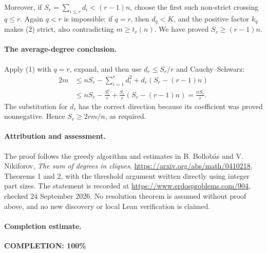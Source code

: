 Moreover, if \(S_r=\sum_{i\leq r}d_i<(r-1)n\), choose
the first such non-strict crossing \(q\leq r\).
Again \(q<r\) is impossible; if \(q=r\), then
\(d_q<K\), and the positive factor \(k_q\) makes (2)
strict, also contradicting \(m\geq t_r(n)\).
We have proved \(S_r\geq(r-1)n\).

\paragraph{The average-degree conclusion.}
Apply (1) with \(q=r\), expand, and then use
\(d_r\leq S_r/r\) and Cauchy--Schwarz:
\[
 \begin{split}
 2m
 &\leq nS_r-\sum_{i=1}^r d_i^2
             +d_r(S_r-(r-1)n)\\
 &\leq nS_r-\frac{S_r^2}{r}
             +\frac{S_r}{r}(S_r-(r-1)n)
 =\frac{nS_r}{r}.
 \end{split}
\]
The substitution for \(d_r\) has the correct direction
because its coefficient was proved nonnegative.
Hence \(S_r\geq2rm/n\), as required.

\paragraph{Attribution and assessment.}
The proof follows the greedy algorithm and estimates in
B. Bollob\'as and V. Nikiforov, \emph{The sum of degrees
in cliques}, \url{https://arxiv.org/abs/math/0410218},
Theorems 1 and 2, with the threshold argument written
directly using integer part sizes.
The statement is recorded at
\url{https://www.erdosproblems.com/904}, checked
24 September 2026. No resolution theorem is assumed
without proof above, and no new discovery or local
Lean verification is claimed.

\paragraph{Completion estimate.}
\textbf{COMPLETION: 100\%}
